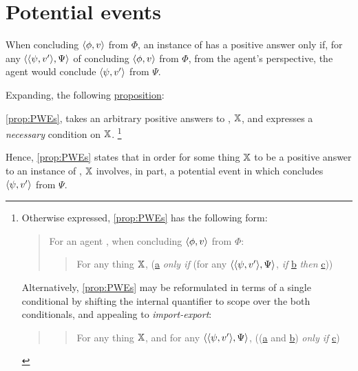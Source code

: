\section{Potential events}
\label{cha:zSpA:sec:positive-answers-qzs}

\begin{note}

  When concluding \(\pv{\phi}{v}\) from \(\Phi\), an instance of \qzS{} has a positive answer only if, for any \requ{} \(\pvp{\psi}{v'}{\Psi}\) of concluding \(\pv{\phi}{v}\) from \(\Phi\), from the agent's perspective, the agent would conclude \(\pv{\psi}{v'}\) from \(\Psi\).

  Expanding, the following \hyperref[prop:PWEs]{proposition}:

  \propPotentialEvents*

  \autoref{prop:PWEs}, takes an arbitrary positive answers to \qzS{}, \(\qzSaV{}\), and expresses a \emph{necessary} condition on \(\qzSaV{}\).%
  \footnote{
    Otherwise expressed, \autoref{prop:PWEs} has the following form:

    \begin{quote}
      For an agent \vAgent{}, when concluding \(\pv{\phi}{v}\) from \(\Phi\):
      \begin{quote}
        For any thing \(\qzSaV{}\), (\hyperref[prop:PWEs:a]{a} \emph{only if} (for any \(\pvp{\psi}{v'}{\Psi}\), \emph{if} \hyperref[prop:PWEs:b]{b} \emph{then} \hyperref[prop:PWEs:c]{c}))
      \end{quote}
    \end{quote}
    Alternatively, \autoref{prop:PWEs} may be reformulated in terms of a single conditional by shifting the internal quantifier to scope over the both conditionals, and appealing to \emph{import-export}:
    \begin{quote}
      \begin{quote}
        For any thing \(\qzSaV{}\), and for any \(\pvp{\psi}{v'}{\Psi}\), ((\hyperref[prop:PWEs:a]{a} and \hyperref[prop:PWEs:b]{b}) \emph{only if} \hyperref[prop:PWEs:c]{c})
      \end{quote}
    \end{quote}
  }

  Hence, \autoref{prop:PWEs} states that in order for some thing \(\qzSaV{}\) to be a positive answer to an instance of \qzS{}, \(\qzSaV{}\) involves, in part, a potential event in which \vAgent{} concludes \(\pv{\psi}{v'}\) from \(\Psi\).
\end{note}

